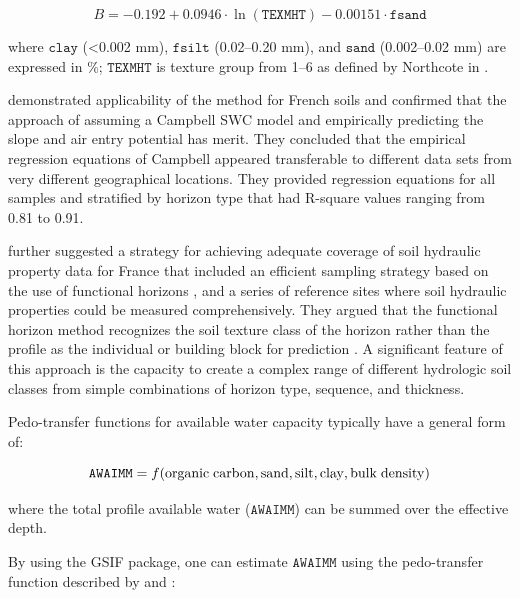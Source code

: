 \documentclass[11pt]{krantz}
\theoremstyle{definition}
\theoremstyle{definition}
\theoremstyle{definition}
\theoremstyle{remark}
\begin{document}
\begin{equation}
B = -0.192 + 0.0946\cdot \ln({\mathtt{TEXMHT}}) - 0.00151\cdot \mathtt{fsand}
\end{equation}

where \(\mathtt{clay}\) (\textless{}0.002 mm), \(\mathtt{fsilt}\)
(0.02--0.20 mm), and \(\mathtt{sand}\) (0.002--0.02 mm) are expressed in
\%; \(\mathtt{TEXMHT}\) is texture group from 1--6 as defined by
Northcote in \citet{peverill1999soil}.

\citet{Cresswell2006SUM} demonstrated applicability of the
\citet{Williams1992} method for French soils and confirmed that the
approach of assuming a Campbell SWC model and empirically predicting the
slope and air entry potential has merit. They concluded that the
empirical regression equations of Campbell appeared transferable to
different data sets from very different geographical locations. They
provided regression equations for all samples and stratified by horizon
type that had R-square values ranging from 0.81 to 0.91.

\citet{Cresswell2006SUM} further suggested a strategy for achieving
adequate coverage of soil hydraulic property data for France that
included an efficient sampling strategy based on the use of functional
horizons \citep{Bouma1989S}, and a series of reference sites where soil
hydraulic properties could be measured comprehensively. They argued that
the functional horizon method recognizes the soil texture class of the
horizon rather than the profile as the individual or building block for
prediction \citep{Wosten1985SSSAJ, Wosten1992}. A significant feature of
this approach is the capacity to create a complex range of different
hydrologic soil classes from simple combinations of horizon type,
sequence, and thickness.

Pedo-transfer functions for available water capacity typically have a
general form of:

\begin{equation}
{\mathtt{AWAIMM}} = f ({\rm organic} \; {\rm carbon}, {\rm sand}, {\rm silt}, {\rm clay},  {\rm bulk} \; {\rm density})
\end{equation}

where the total profile available water (\(\mathtt{AWAIMM}\)) can be
summed over the effective depth.

By using the GSIF package, one can estimate \(\mathtt{AWAIMM}\) using
the pedo-transfer function described by \citet{hodnett2002marked} and
\citet{wosten2013soil}:
\end{document}
